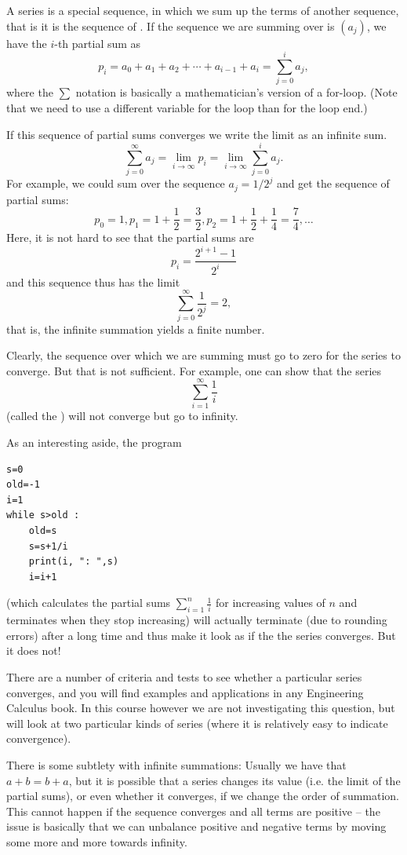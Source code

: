 A series is a special sequence, in which we sum up the terms of another
sequence, that is it is the sequence of .  If the
sequence we are summing over is $(a_j)$, we have the $i$-th partial sum as
\[
p_i=a_0+a_1+a_2+\cdots+a_{i-1}+a_i=\sum_{j=0}^i a_j,
\]
where the $\sum$ notation is basically a mathematician's version of a for-loop.
(Note that we need to use a different variable for the loop than for the loop end.)

If this sequence of partial sums converges we write the limit as an infinite sum.
\[
\sum_{j=0}^\infty a_j=\lim_{i\to\infty} p_i=\lim_{i\to\infty} \sum_{j=0}^i a_j.
\]
For example, we could sum over the
sequence $a_j=1/2^j$ and get the sequence of partial sums:
\[
p_0=1,
p_1=1+\frac{1}{2}=\frac{3}{2}, 
p_2=1+\frac{1}{2}+\frac{1}{4}=\frac{7}{4}, \ldots
\]
Here, it is not hard to see that the partial sums are
\[
p_i=\frac{2^{i+1}-1}{2^i}
\]
and this sequence thus has the limit
\[
\sum_{j=0}^\infty \frac{1}{2^j}=2,
\]
that is, the infinite summation yields a finite number.
\smallskip

Clearly, the sequence over which we are summing must go to zero for the series to
converge. But that is not sufficient. For example, one can show that the series
\[
\sum_{i=1}^\infty \frac{1}{i}
\]
(called the ) will not converge but go to infinity.

As an interesting aside, the program
\begin{verbatim}
s=0
old=-1
i=1
while s>old :
    old=s
    s=s+1/i
    print(i, ": ",s)
    i=i+1
\end{verbatim}
(which calculates the partial sums $\sum_{i=1}^n \frac{1}{i}$ for increasing
values of $n$ and terminates when they stop increasing) will
actually terminate (due to rounding errors) after a long time and thus
make it look as if the the series converges. But it does not!
\medskip

There are a number of criteria and tests to see whether a particular series converges,
and you will find examples and applications in any Engineering Calculus book. In this
course however we are not investigating this question, but will look at two particular
kinds of series (where it is relatively easy to indicate convergence).

\begin{note}
There is some subtlety with infinite summations: Usually we have that $a+b=b+a$, but it
is possible that a series changes its value (i.e. the limit of the partial sums), or
even whether it converges, if we change the order of summation.
This cannot happen if the sequence converges and all terms are positive -- the issue is
basically that we can unbalance positive and negative terms by moving some more and more
towards infinity.
\end{note}

